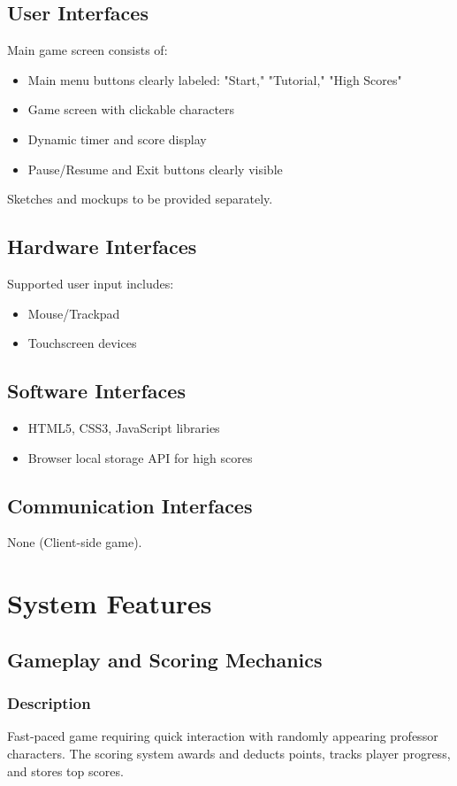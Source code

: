 \documentclass{scrreprt}
\begin{document}
\section{User Interfaces}
Main game screen consists of:
\begin{itemize}
    \item Main menu buttons clearly labeled: "Start," "Tutorial," "High Scores"
    \item Game screen with clickable characters
    \item Dynamic timer and score display
    \item Pause/Resume and Exit buttons clearly visible
\end{itemize}

Sketches and mockups to be provided separately.

\section{Hardware Interfaces}
Supported user input includes:
\begin{itemize}
    \item Mouse/Trackpad
    \item Touchscreen devices
\end{itemize}

\section{Software Interfaces}
\begin{itemize}
    \item HTML5, CSS3, JavaScript libraries
    \item Browser local storage API for high scores
\end{itemize}

\section{Communication Interfaces}
None (Client-side game).

\chapter{System Features}

\section{Gameplay and Scoring Mechanics}

\subsection{Description}
Fast-paced game requiring quick interaction with randomly appearing professor characters. The scoring system awards and deducts points, tracks player progress, and stores top scores.
\end{document}
